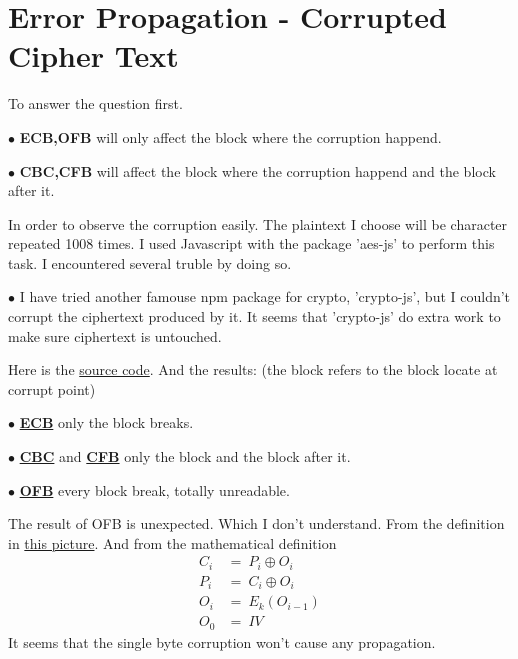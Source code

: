 \documentclass{article}
\begin{document}
\section{Error Propagation - Corrupted Cipher Text}
To answer the question first.
\begin{tlist}{2}
	\item[$\bullet$]\textbf{ECB,OFB} will only affect the block where the corruption happend.
	\item[$\bullet$]\textbf{CBC,CFB} will affect the block where the corruption happend and the block after it.
\end{tlist}
In order to observe the corruption easily. The plaintext I choose will be character  repeated 1008 times.
I used Javascript with the package 'aes-js' to perform this task. I encountered several truble by doing so.
\begin{tlist}{2}
	\item[$\bullet$]I have tried another famouse npm package for crypto, 'crypto-js', but I couldn't corrupt the ciphertext produced by it. It seems that 'crypto-js' do extra work to make sure ciphertext is untouched.
\end{tlist}
Here is the \href{https://github.com/Luna1996/WUSTL/blob/master/571/L2/task3.js}{source code}. And the results: (the block refers to the block locate at corrupt point)
\begin{tlist}{2}
	\item[$\bullet$]
	\href{https://github.com/Luna1996/WUSTL/blob/master/571/L2/ecb.txt}{\textbf{ECB}}
	only the block breaks.
	\item[$\bullet$]
	\href{https://github.com/Luna1996/WUSTL/blob/master/571/L2/cbc.txt}{\textbf{CBC}}
	and
	\href{https://github.com/Luna1996/WUSTL/blob/master/571/L2/cfb.txt}{\textbf{CFB}}
	only the block and the block after it.
	\item[$\bullet$]
	\href{https://github.com/Luna1996/WUSTL/blob/master/571/L2/ofb.txt}{\textbf{OFB}}
	every block break, totally unreadable.
\end{tlist}
The result of OFB is unexpected. Which I don't understand. From the definition in \href{https://i.loli.net/2018/09/24/5ba8a461a5228.png}{this picture}. And from the mathematical definition
$$
	\begin{aligned}
		C_i & =\ P_i\oplus O_i \\
		P_i & =\ C_i\oplus O_i \\
		O_i & =\ E_k(O_{i-1})  \\
		O_0 & =\ IV
	\end{aligned}
$$
It seems that the single byte corruption won't cause any propagation.
\end{document}
